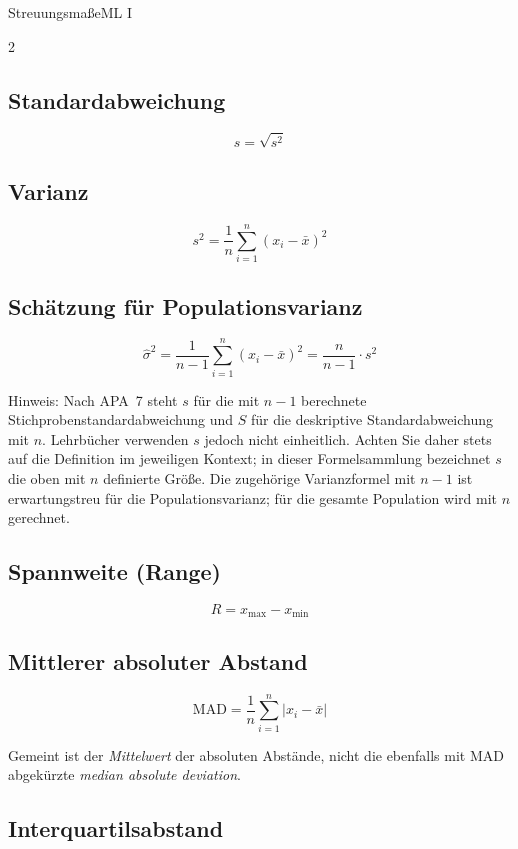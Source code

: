 \begin{formulaBox}{Streuungsmaße}{ML I}
\begin{multicols}{2}

\subsection*{Standardabweichung}
$$s=\sqrt{s^2}$$

\subsection*{Varianz}

$$s^2=\frac{1}{n}\sum\limits_{i=1}^{n}(x_i-\bar{x})^2$$

\subsection*{Schätzung für Populationsvarianz}

$$\hat{\sigma}^2=\frac{1}{n-1}\sum\limits_{i=1}^n(x_i-\bar{x})^2=\frac{n}{n-1}\cdot s^2$$

Hinweis: Nach APA~7 steht $s$ für die mit $n-1$ berechnete Stichprobenstandardabweichung und $S$ für die deskriptive Standardabweichung mit $n$. Lehrbücher verwenden $s$ jedoch nicht einheitlich. Achten Sie daher stets auf die Definition im jeweiligen Kontext; in dieser Formelsammlung bezeichnet $s$ die oben mit $n$ definierte Größe. Die zugehörige Varianzformel mit $n-1$ ist erwartungstreu für die Populationsvarianz; für die gesamte Population wird mit $n$ gerechnet.

\subsection*{Spannweite (Range)} 

\begin{equation*}
R=x_\mathrm{max}-x_\mathrm{min}
\end{equation*}

\subsection*{Mittlerer absoluter Abstand}

$$\mathrm{MAD} = \frac{1}{n}\sum_{i=1}^n|x_i-\bar{x}|$$

Gemeint ist der \emph{Mittelwert} der absoluten Abstände, nicht die ebenfalls mit MAD abgekürzte \emph{median absolute deviation}.

\subsection*{Interquartilsabstand}


\end{multicols}
\end{formulaBox}
